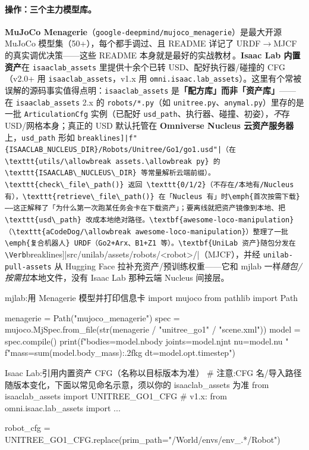 \paragraph{操作：三个主力模型库。}\textbf{MuJoCo Menagerie}（\texttt{google-deepmind/\allowbreak mujoco\_menagerie}）是最大开源 MuJoCo 模型集（50+），每个都手调过、且 README 详记了 URDF$\to$MJCF 的真实调优决策——这些 README 本身就是最好的实战教材\,\cite{menagerie2022}。\textbf{Isaac Lab 内置资产}在 \texttt{isaaclab\_assets} 里提供十余个已转 USD、配好执行器/碰撞的 CFG（v2.0+ 用 \texttt{isaaclab\_assets}，v1.x 用 \texttt{omni.\allowbreak isaac.\allowbreak lab\_assets}）。这里有个常被误解的源码事实值得点明：\texttt{isaaclab\_assets} 是\textbf{「配方库」而非「资产库」}——在 \texttt{isaaclab\_assets} 2.x 的 \texttt{robots/*.py}（如 \texttt{unitree.py}、\texttt{anymal.py}）里存的是一批 \texttt{ArticulationCfg} 实例（已配好 \texttt{usd\_path}、执行器、碰撞、初姿），\emph{不}存 USD/网格本身；真正的 USD 默认托管在 \textbf{Omniverse Nucleus 云资产服务器}上，\texttt{usd\_path} 形如 \Verb[breaklines]|f"{ISAACLAB_NUCLEUS_DIR}/Robots/Unitree/Go1/go1.usd"|（在 \texttt{utils/\allowbreak assets.\allowbreak py} 的 \texttt{ISAACLAB\_NUCLEUS\_DIR} 等常量解析云端前缀）。\texttt{check\_file\_path()} 返回 \texttt{0/1/2}（不存在/本地有/Nucleus 有），\texttt{retrieve\_file\_path()} 在「Nucleus 有」时\emph{首次按需下载}——这正解释了「为什么第一次跑某任务会卡在下载资产」；要离线就把资产镜像到本地、把 \texttt{usd\_path} 改成本地绝对路径。\textbf{awesome-loco-manipulation}（\texttt{aCodeDog/\allowbreak awesome-loco-manipulation}）整理了一批\emph{复合机器人} URDF（Go2+Arx、B1+Z1 等）。\textbf{UniLab 资产}随包分发在 \Verb[breaklines]|src/unilab/assets/robots/<robot>/|（MJCF），并经 \texttt{unilab-pull-assets} 从 Hugging Face 拉补充资产/预训练权重——它和 mjlab 一样\emph{随包/按需拉}本地文件，没有 Isaac Lab 那种云端 Nucleus 间接层。

\begin{codebox}[Python]{mjlab:用 Menagerie 模型并打印信息卡}
import mujoco
from pathlib import Path

menagerie = Path("mujoco_menagerie")
spec = mujoco.MjSpec.from_file(str(menagerie / "unitree_go1" / "scene.xml"))
model = spec.compile()
print(f"bodies={model.nbody} joints={model.njnt} nu={model.nu} "
      f"mass={sum(model.body_mass):.2f}kg dt={model.opt.timestep}")
\end{codebox}

\begin{codebox}[Python]{Isaac Lab:引用内置资产 CFG（名称以目标版本为准）}
# 注意:CFG 名/导入路径随版本变化，下面以常见命名示意，须以你的 isaaclab_assets 为准
from isaaclab_assets import UNITREE_GO1_CFG   # v1.x: from omni.isaac.lab_assets import ...

robot_cfg = UNITREE_GO1_CFG.replace(prim_path="/World/envs/env_.*/Robot")
\end{codebox}


